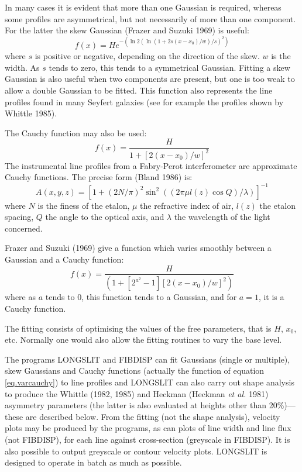 In many cases it is evident that more than one
Gaussian is required, whereas some profiles are asymmetrical, but not
necessarily of more than one component.
For the latter the skew Gaussian (Frazer and Suzuki 1969) is useful:
\[
     f(x) = H e^{-(\ln 2(\ln (1+2s(x-x_{0})/w)/s)^{2})}
\]
where $s$ is positive or negative, depending on the direction of the
skew.
$w$ is the width.
As $s$ tends to zero, this tends to a symmetrical Gaussian.
Fitting a skew Gaussian is also useful when two components are present,
but one is too weak to allow a double Gaussian to be fitted.
This function also represents the line profiles found in many Seyfert
galaxies (see for example the profiles shown by Whittle 1985).

The Cauchy function may also be used:
\[
     f(x) = \frac{H}{1+[2(x-x_{0})/w]^{2}}
\]
The instrumental line profiles from a Fabry-Perot interferometer are
approximate Cauchy functions.
The precise form (Bland 1986) is:
\[
A(x,y,z) =
[1+(2N/\pi )^{2}\sin^{2}((2\pi \mu l(z)\cos Q)/\lambda )]^{-1}
\]
where $N$ is the finess of the etalon, $\mu$ the refractive index of
air, $l(z)$ the etalon spacing, $Q$ the angle to the optical axis, and
$\lambda$ the wavelength of the light concerned.

Frazer and Suzuki (1969) give a function which varies smoothly between a
Gaussian and a Cauchy function:
\begin{equation}
     f(x) = \frac{H}{(1+[2^{a^{2}}-1][2(x-x_{0})/w]^{2})}
\label{eq.varcauchy}
\end{equation}
where as $a$ tends to 0, this function tends to a Gaussian, and for
$a=1$, it is a Cauchy function.

The fitting consists of optimising the values of the free parameters,
that is $H$, $x_{0}$, etc.
Normally one would also allow the fitting routines to vary the base
level.

The programs LONGSLIT and FIBDISP can fit Gaussians (single or
multiple), skew Gaussians and Cauchy functions (actually the function of
equation \ref{eq.varcauchy}) to line profiles and LONGSLIT can also
carry out shape analysis to produce the Whittle (1982, 1985) and Heckman
(Heckman {\it et al.} 1981) asymmetry parameters (the latter is also
evaluated at heights other than 20\%)---these are described below.
From the fitting (not the shape analysis), velocity plots may be
produced by the programs, as can plots of line width and line flux (not
FIBDISP), for each line against cross-section (greyscale in FIBDISP).
It is also possible to output greyscale or contour velocity plots.
LONGSLIT is designed to operate in batch as much as possible.

